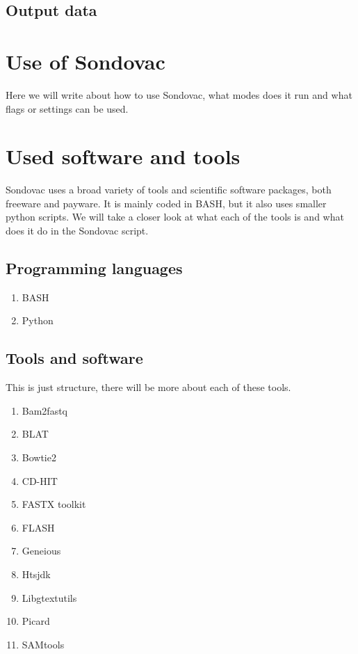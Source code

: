 \subsection{Output data}

\section{Use of Sondovac}
Here we will write about how to use Sondovac, what modes does it run and what flags or settings can be used. 
\section{Used software and tools}

Sondovac uses a broad variety of tools and scientific software packages, both freeware and payware. It is mainly coded in BASH, but it also uses smaller python 
scripts. We will take a closer look at what each of the tools is and what does it do in the Sondovac script. 

\subsection{Programming languages}
\begin{enumerate}
\item BASH
\item Python
\end{enumerate}

\subsection{Tools and software}

This is just structure, there will be more about each of these tools. 

\begin{enumerate}
\item Bam2fastq
\item BLAT
\item Bowtie2
\item CD-HIT
\item FASTX toolkit
\item FLASH
\item Geneious
\item Htsjdk
\item Libgtextutils
\item Picard
\item SAMtools
\end{enumerate}

